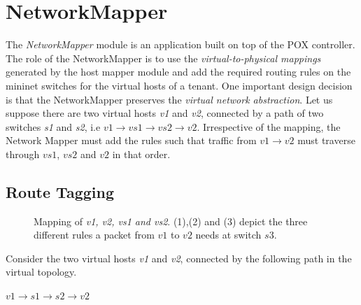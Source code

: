 \section{NetworkMapper}
The \emph{NetworkMapper} module is an application built on top of the POX controller. The role of the NetworkMapper is to use the \emph{virtual-to-physical mappings} generated by the host mapper module and add the required routing rules on the mininet switches for the virtual hosts of a tenant. One important design decision is that the NetworkMapper preserves the \emph{virtual network abstraction}. Let us suppose there are two virtual hosts \emph{v1} and \emph{v2}, connected by a path of two switches \emph{s1} and \emph{s2}, i.e $v1 \rightarrow vs1 \rightarrow vs2 \rightarrow v2 $.  Irrespective of the mapping, the Network Mapper must add the rules such that traffic from $v1 \rightarrow v2 $ must traverse through $vs1$, $vs2 $ and $v2$ in that order. 

\subsection{Route Tagging}
\begin{figure}
	\noindent
	\caption{Mapping of \emph{v1, v2, vs1 and vs2}. (1),(2) and (3) depict the three different rules a packet from $v1$ to $v2$ needs at switch $s3$.}
\end{figure}
Consider the two virtual hosts \emph{v1} and \emph{v2}, connected by the following path  in the virtual topology.
\begin{center}
	$v1 \rightarrow s1 \rightarrow s2 \rightarrow v2 $
\end{center}

